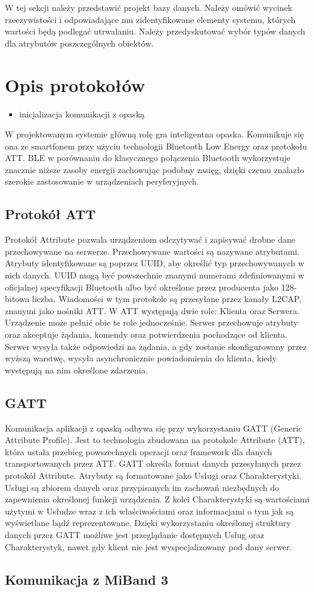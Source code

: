 W tej sekcji należy przedstawić projekt bazy danych. Należy omówić wycinek rzeczywistości i odpowiadające mu zidentyfikowane elementy systemu, których wartości będą podlegać utrwalaniu. Należy przedyskutować wybór typów danych dla atrybutów poszczególnych obiektów.  

\section{Opis protokołów}
\begin{itemize}
    \item inicjalizacja komunikacji z opaską
\end{itemize}

W projektowanym systemie główną rolę gra inteligentna opaska. Komunikuje się ona ze smartfonem przy użyciu technologii Bluetooth Low Energy oraz protokołu ATT. BLE w porównaniu
do klasycznego połączenia Bluetooth wykorzystuje znacznie niższe zasoby energii zachowując podobny zasięg, dzięki czemu znalazło
szerokie zastosowanie w urządzeniach peryferyjnych.
\subsection{Protokół ATT}
Protokół Attribute pozwala urządzeniom odczytywać i zapisywać drobne dane przechowywane na serwerze.
Przechowywane wartości są nazywane atrybutami. Atrybuty identyfikowane są poprzez
UUID, aby określić typ przechowywanych w nich danych. UUID mogą być powszechnie znanymi
numerami zdefiniowanymi w oficjalnej specyfikacji Bluetooth albo być
określone przez producenta jako 128-bitowa liczba. Wiadomości w tym
protokole są przesyłane przez kanały L2CAP, znanymi jako nośniki ATT. W ATT
występują dwie role: Klienta oraz Serwera. Urządzenie może pełnić obie te role
jednocześnie. Serwer przechowuje atrybuty oraz akceptuje żądania, komendy
oraz potwierdzenia pochodzące od klienta. Serwer wysyła także odpowiedzi na
żądania, a gdy zostanie skonfigurowany przez wyższą warstwę, wysyła asynchronicznie powiadomienia
do klienta, kiedy występują na nim określone zdarzenia.
\subsection{GATT}
Komunikacja aplikacji z opaską odbywa się przy wykorzystaniu GATT (Generic Attribute Profile). Jest to technologia zbudowana na protokole Attribute (ATT), która
ustala przebieg powszechnych operacji oraz framework dla danych transportowanych przez ATT.
GATT określa format danych przesyłanych przez protokół Attribute. Atrybuty są
formatowane jako Usługi oraz Charakterystyki. Usługi są zbiorem danych oraz
przypisanych im zachowań niezbędnych do zapewnienia określonej funkcji urządzenia.
Z kolei Charakterystyki są wartościami użytymi w Usłudze wraz z ich właściwościami
oraz informacjami o tym jak są wyświetlane bądź reprezentowane. Dzięki
wykorzystaniu określonej struktury danych przez GATT możliwe jest przeglądanie
dostępnych Usług oraz Charakterystyk, nawet gdy klient nie jest wyspecjalizowany
pod dany serwer.
\subsection{Komunikacja z MiBand 3}
